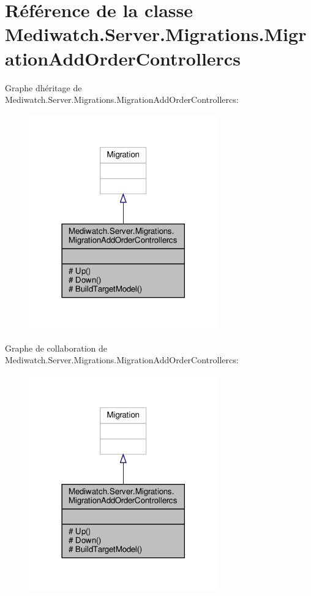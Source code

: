 \hypertarget{class_mediwatch_1_1_server_1_1_migrations_1_1_migration_add_order_controllercs}{}\section{Référence de la classe Mediwatch.\+Server.\+Migrations.\+Migration\+Add\+Order\+Controllercs}
\label{class_mediwatch_1_1_server_1_1_migrations_1_1_migration_add_order_controllercs}


Graphe d\textquotesingle{}héritage de Mediwatch.\+Server.\+Migrations.\+Migration\+Add\+Order\+Controllercs\+:\nopagebreak
\begin{figure}[H]
\begin{center}
\leavevmode
\includegraphics[width=230pt]{class_mediwatch_1_1_server_1_1_migrations_1_1_migration_add_order_controllercs__inherit__graph}
\end{center}
\end{figure}


Graphe de collaboration de Mediwatch.\+Server.\+Migrations.\+Migration\+Add\+Order\+Controllercs\+:\nopagebreak
\begin{figure}[H]
\begin{center}
\leavevmode
\includegraphics[width=230pt]{class_mediwatch_1_1_server_1_1_migrations_1_1_migration_add_order_controllercs__coll__graph}
\end{center}
\end{figure}
